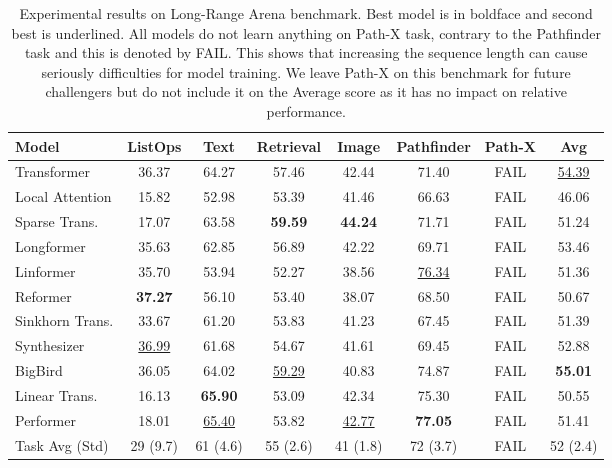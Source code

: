 \documentclass{article} \usepackage{iclr2021_conference,times}
\newcommand{\lra}{Long-Range Arena\xspace}
\begin{document}
\begin{table}[]
    \centering
    \begin{tabular}{l|cccccc|c}
    \toprule
      Model    & ListOps & Text  & Retrieval &  Image & Pathfinder & Path-X & Avg \\
   \midrule
        Transformer &  36.37 & 64.27 &
        57.46 &  42.44& 71.40 & FAIL & \underline{54.39}\\
           \midrule
        Local Attention &  15.82 &52.98 & 53.39 & 41.46& 66.63 & FAIL & 46.06 \\
        Sparse Trans.  & 17.07 & 63.58 & \textbf{59.59} & \textbf{44.24} & 71.71 & FAIL  & 51.24 \\
        Longformer& 35.63& 62.85 & 56.89&  42.22 & 69.71 & FAIL & 53.46 \\
        Linformer &   35.70 & 53.94&  52.27 & 38.56 & \underline{76.34} & FAIL & 51.36\\
        Reformer &  \textbf{37.27} & 56.10 & 53.40 &  38.07& 68.50 & FAIL & 50.67 \\
        Sinkhorn Trans. &33.67 & 61.20 & 53.83 & 41.23 & 67.45 & FAIL & 51.39\\
        Synthesizer & \underline{36.99} & 61.68 & 54.67  &41.61 & 69.45 & FAIL & 52.88\\
        BigBird  & 36.05 & 64.02 & \underline{59.29}  &  40.83 & 74.87 & FAIL & \textbf{55.01} \\
        Linear Trans. & 16.13&  \textbf{65.90} & 53.09 & 42.34 & 75.30 & FAIL & 50.55 \\ 
        Performer  &18.01& \underline{65.40} & 53.82 & \underline{42.77} & \textbf{77.05} & FAIL & 51.41\\
        \midrule 
        Task Avg (Std) & 29 (9.7) & 61 (4.6) & 55 (2.6) & 41 (1.8) & 72 (3.7) & FAIL & 52 (2.4)\\ 
      \bottomrule
    \end{tabular}
    \caption{Experimental results on \lra benchmark. Best model is in boldface and second best is underlined. All models do not learn anything on Path-X task, contrary to the Pathfinder task and this is denoted by FAIL. This shows that increasing the sequence length can cause seriously difficulties for model training. We leave Path-X on this benchmark for future challengers but do not include it on the Average score as it has no impact on relative performance.}
    \label{tab:my_label}
\end{table}
\end{document}
